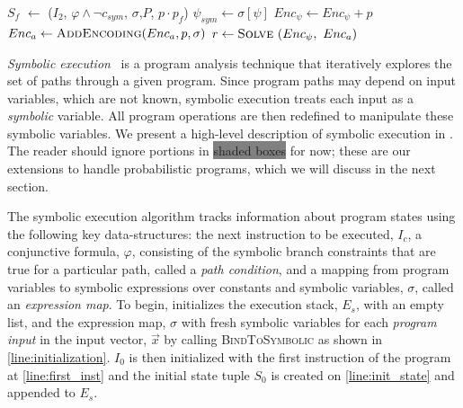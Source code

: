 \documentclass[acmsmall,review,anonymous]{acmart}\settopmatter{printfolios=true,printccs=false,printacmref=false}
\newcommand*\Let[2]{\State #1 $\gets$ #2}
\begin{document}
\begin{algorithm}
\begin{algorithmic}[1]
		\Let{$S_{f}$}{($I_{2}$, $\varphi \wedge \neg c_{sym}$, $\sigma$,\colorbox[RGB]{200, 200, 200}{$P$, $p \cdot p_f$})} \label{line:symbex_false_state}
		\EndCase \label{line:end_symbex_branch}
		 
		 $\psi_{sym}\gets\sigma[\psi]$ \label{line:beg_enc}
		 $Enc_\psi \gets Enc_\psi + p$	\label{line:encoding_t}	 
		 $Enc_a \gets \textsc{AddEncoding}(Enc_a,p,\sigma)$ \label{line:encoding_a}
		\EndCase
		\EndSwitch \label{line:end_execution_loop}
		\EndWhile 
		 $r \gets\textsc{Solve}~(Enc_\psi,~Enc_a)$ \label{line:solve_encoding}
		\EndProcedure
	\end{algorithmic}
\end{algorithm}

\textit{Symbolic execution}~\citep{king1976} is a program analysis technique that iteratively explores the set of paths through a given program.
% 
Since program paths may depend on input variables, which are not known, symbolic execution treats each input as a \emph{symbolic} variable.
% 
All program operations are then redefined to manipulate these symbolic variables.
% 
We present a high-level description of symbolic execution in .
% 
The reader should ignore portions in \colorbox{gray}{shaded boxes} for now; these are our extensions to handle probabilistic programs, which we will discuss in the next section.


The symbolic execution algorithm tracks information about program states using the following key data-structures: the next instruction to be executed, $I_c$, a conjunctive formula, $\varphi$, consisting of the symbolic branch constraints that are true for a particular path, called a \textit{path condition}, and a mapping from program variables to symbolic expressions over constants and symbolic variables, $\sigma$, called an \textit{expression map}.
% 
To begin,  initializes the execution stack, $E_s$, with an empty list, and the expression map, $\sigma$ with fresh symbolic variables for each \textit{program input} in the input vector, $\vec{x}$ by calling \textsc{BindToSymbolic} as shown in \cref{line:initialization}.
% 
$I_0$ is then initialized with the first instruction of the program at \cref{line:first_inst} and the initial state tuple $S_0$ is created on \cref{line:init_state} and appended to $E_s$.
\end{document}
